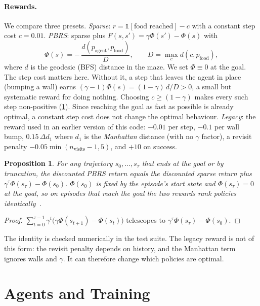 \documentclass[11pt]{article}
\newtheorem{proposition}{Proposition}
\begin{document}
\paragraph{Rewards.} We compare three presets.
\emph{Sparse}: $r=\mathbb{1}[\text{food reached}]-c$ with a constant step
cost $c=0.01$.
\emph{PBRS}: sparse plus $F(s,s')=\gamma\Phi(s')-\Phi(s)$ with
\begin{equation}
  \Phi(s) = -\,\frac{d(p_{\text{agent}},p_{\text{food}})}{D},\qquad D=\max_{c} d(c,p_{\text{food}}),
\end{equation}
where $d$ is the geodesic (BFS) distance in the maze. We set $\Phi\equiv0$ at
the goal. The step cost matters here. Without it, a step that leaves the agent
in place (bumping a wall) earns $(\gamma-1)\Phi(s)=(1-\gamma)\,d/D>0$, a small
but systematic reward for doing nothing. Choosing $c\ge(1-\gamma)$ makes every
such step non-positive (\cref{sec:agents}). Since reaching the goal as fast as
possible is already optimal, a constant step cost does not change the
optimal behaviour.
\emph{Legacy}: the reward used in an earlier version of this code:
$-0.01$ per step, $-0.1$ per wall bump, $0.15\,\Delta d_{1}$ where $d_1$ is
the \emph{Manhattan} distance (with no $\gamma$ factor), a revisit penalty
$-0.05\min(n_{\text{visits}}-1,5)$, and $+10$ on success.

\begin{proposition}\label{prop:pbrs}
For any trajectory $s_0,\dots,s_\tau$ that ends at the goal or by truncation,
the discounted PBRS return equals the discounted sparse return plus
$\gamma^{\tau}\Phi(s_\tau)-\Phi(s_0)$. $\Phi(s_0)$ is fixed by the
episode's start state and $\Phi(s_\tau)=0$ at the goal, so
on episodes that reach the goal the two rewards rank policies identically~\citep{ng1999policy,grzes2017reward}.
\end{proposition}
\begin{proof}
$\sum_{t=0}^{\tau-1}\gamma^{t}\big(\gamma\Phi(s_{t+1})-\Phi(s_t)\big)$ telescopes
to $\gamma^{\tau}\Phi(s_\tau)-\Phi(s_0)$.
\end{proof}

The identity is checked numerically in the test suite. The legacy reward is
not of this form: the revisit penalty depends on history, and the Manhattan
term ignores walls and $\gamma$. It can therefore change which policies are
optimal.

\section{Agents and Training}\label{sec:agents}
\end{document}
